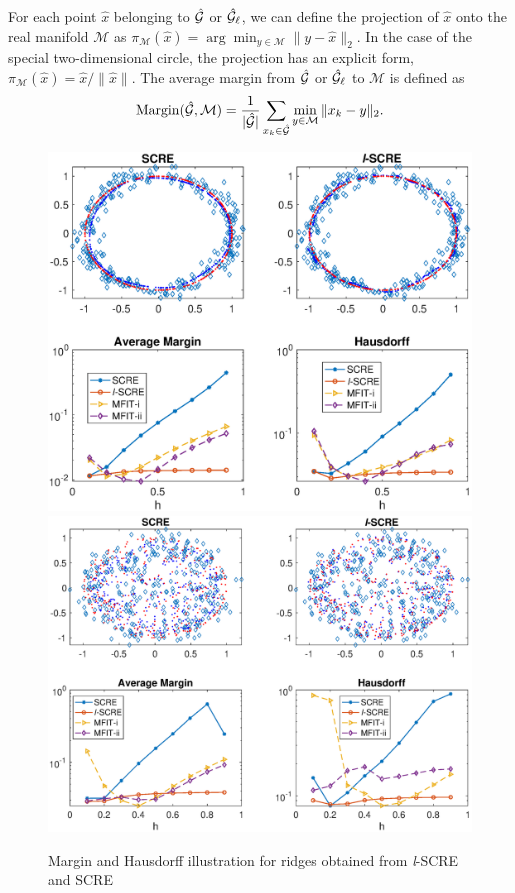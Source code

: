 \documentclass[aos,preprint]{imsart}
\theoremstyle{remark}
\begin{document}
For each point $\hat{x}$ belonging to ${\cal \hat{G}}$ or ${\cal \hat{G}}_\ell$, we can define the projection of $\hat{x}$ onto the real manifold $\mathcal M$ as $\pi_{\mathcal M}(\hat{x}) = \arg\min_{y\in \mathcal M} \|y-\hat{x}\|_2$. In the case of the special two-dimensional circle, the projection has an explicit form, $\pi_{\mathcal M}(\hat{x}) = \hat{x}/\|\hat{x}\|$. The average margin from $\cal \hat{G}$ or ${ \cal \hat{G}}_\ell$ to $\mathcal M$ is defined as
\[
{\rm Margin}({ \cal \hat{G}, \mathcal M}) =\frac{1}{|{\cal \hat{G}}|}  \sum_{x_k\in  {\cal \hat{G}}} \min_{y\in \mathcal M}\|x_k-y\|_2.
\]
\begin{figure}[h] %
   \includegraphics[width=\linewidth]{circle9.eps} 
   \includegraphics[width=\linewidth]{sphere8n.eps} 
   \vspace{-1cm}
   \caption{Margin and Hausdorff illustration for ridges obtained from {\it l}-SCRE and SCRE}
   \label{fig:circle6}
\end{figure}
\end{document}
